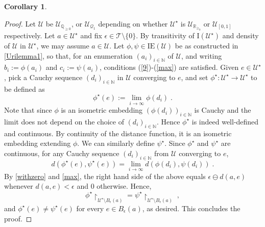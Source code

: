 \documentclass{article}
\newtheorem{corollary}[theorem]{Corollary}
\theoremstyle{remark}
\theoremstyle{definition}
\newcommand{\U}[0]{\mathbb{U}}
\newcommand{\N}[0]{\mathbb{N}}
\renewcommand{\U}[0]{\mathcal{U}}
\renewcommand\geq{\geqslant}
\begin{document}
{{{{{\begin{corollary}
\end{corollary}
\begin{proof}
Let $\U$ be $\U_{\mathbb{Q}_{\geq 0}}$, or $\U_{\mathcal{Q}_1}$ depending on whether $\U^\star$ is $\U_{\mathbb{R}_{\geq_0}}$ or $\U_{[0,1]}$ respectively. Let $a\in\U^\star$ and fix $\epsilon\in \mathcal T\setminus\{0\}$. By transitivity of $\mathrm I(\U^\star)$ and density of  $\U$  in $\U^\star$, we may assume $a\in\U$.
Let $\phi, \psi\in\mathrm{IE}(\U)$ be as constructed in \cref{Urilemma1}, so that, for an enumeration $(a_i)_{i\in\mathbb{N}}$ of $\U$, and writing $b_i:=\phi(a_i)$ and $c_i:=\psi(a_i)$, conditions (\ref{9})-(\ref{max}) are satisfied. 
Given $e\in\U^\star$, pick a  Cauchy sequence $(d_i)_{i\in\mathbb{N}}$ in $\U$ converging to $e$,  and set $\phi^\star:\U^\star\to\U^\star$  to be defined as 
\[\phi^\star(e):=\lim_{i\to\infty} \phi(d_i)\;.\]
{Note that since $\phi$ is an isometric embedding $(\phi(d_i))_{i\in\mathbb{N}}$ is Cauchy and the limit does not depend on the choice of $(d_i)_{i\in\mathbb{N}}$.}
Hence $\phi^\star$ is indeed well-defined and continuous. {By continuity of the distance function, it is an isometric embedding extending
$\phi$.} %
We can similarly define $\psi^\star$. {Since $\phi^\star$ and $\psi^\star$ are continuous, for any Cauchy sequence $(d_i)_{i\in\N}$ from $\U$ converging to $e$,}
\[d(\phi^\star(e), \psi^\star(e))=\lim_{i\to\infty} d(\phi(d_i), \psi(d_i))\;.\]
{By \eqref{withzero} and \eqref{max}, the right hand side of the above equals $\epsilon \ominus d(a,e)$ whenever $d(a, e)<\epsilon$ and $0$ otherwise.}
{Hence,}
\[\phi^\star\upharpoonright_{\U^\star\setminus B_{\epsilon}(a)}=\psi^\star\upharpoonright_{\U^\star\setminus B_{\epsilon}(a)}\;,\]
{and $\phi^\star(e)\neq\psi^\star(e)$ for every $e\in B_\epsilon (a)$, as desired. This concludes the proof.}
\end{proof}


}}}}}
\end{document}
